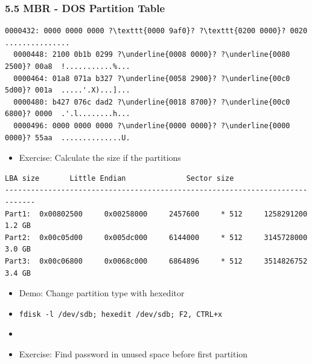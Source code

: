 \begin{frame}[fragile]
  \frametitle{5.5 MBR - DOS Partition Table}
  \begin{lstlisting}[basicstyle=\tiny,escapechar=\?]
  0000432: 0000 0000 0000 ?\texttt{0000 9af0}? ?\texttt{0200 0000}? 0020  ............... 
  0000448: 2100 0b1b 0299 ?\underline{0008 0000}? ?\underline{0080 2500}? 00a8  !...........%...
  0000464: 01a8 071a b327 ?\underline{0058 2900}? ?\underline{00c0 5d00}? 001a  .....'.X)...]...
  0000480: b427 076c dad2 ?\underline{0018 8700}? ?\underline{00c0 6800}? 0000  .'.l........h...
  0000496: 0000 0000 0000 ?\underline{0000 0000}? ?\underline{0000 0000}? 55aa  ..............U.

  \end{lstlisting}
    \begin{itemize}
        \item Exercise: Calculate the size if the partitions
    \end{itemize}
  \begin{lstlisting}[basicstyle=\tiny]
        LBA size       Little Endian              Sector size
-----------------------------------------------------------------------------
Part1:  0x00802500     0x00258000     2457600     * 512     1258291200   1.2 GB
Part2:  0x00c05d00     0x005dc000     6144000     * 512     3145728000   3.0 GB
Part3:  0x00c06800     0x0068c000     6864896     * 512     3514826752   3.4 GB
  \end{lstlisting}
    \begin{itemize}
        \item Demo:     Change partition type with hexeditor
	\item[] \texttt{fdisk -l /dev/sdb; hexedit /dev/sdb; F2, CTRL+x}
	\item[]
        \item Exercise: Find password in unused space before first partition
    \end{itemize}
\end{frame}


